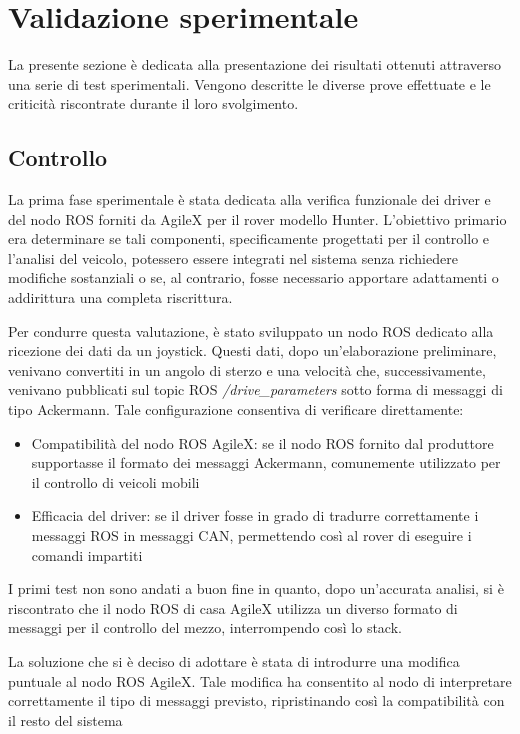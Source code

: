 \chapter{Validazione sperimentale}
La presente sezione è dedicata alla presentazione dei risultati ottenuti attraverso una serie di test sperimentali. Vengono descritte le diverse prove effettuate e le criticità riscontrate durante il loro svolgimento.

\section{Controllo}
La prima fase sperimentale è stata dedicata alla verifica funzionale dei driver e del nodo ROS forniti da AgileX per il rover modello Hunter. L'obiettivo primario era determinare se tali componenti, specificamente progettati per il controllo e l'analisi del veicolo, potessero essere integrati nel sistema senza richiedere modifiche sostanziali o se, al contrario, fosse necessario apportare adattamenti o addirittura una completa riscrittura.

\noindent Per condurre questa valutazione, è stato sviluppato un nodo ROS dedicato alla ricezione dei dati da un joystick. Questi dati, dopo un'elaborazione preliminare, venivano convertiti in un angolo di sterzo e una velocità che, successivamente, venivano pubblicati sul topic ROS \textit{/drive\_parameters} sotto forma di messaggi di tipo Ackermann. Tale configurazione consentiva di verificare direttamente:

\begin{itemize}
  \item Compatibilità del nodo ROS AgileX: se il nodo ROS fornito dal produttore supportasse il formato dei messaggi Ackermann, comunemente utilizzato per il controllo di veicoli mobili
  \item Efficacia del driver: se il driver fosse in grado di tradurre correttamente i messaggi ROS in messaggi CAN, permettendo così al rover di eseguire i comandi impartiti
\end{itemize}

\noindent I primi test non sono andati a buon fine in quanto, dopo un'accurata analisi, si è riscontrato che il nodo ROS di casa AgileX utilizza un diverso formato di messaggi per il controllo del mezzo, interrompendo così lo stack.

\noindent La soluzione che si è deciso di adottare è stata di introdurre una modifica puntuale al nodo ROS AgileX. Tale modifica ha consentito al nodo di interpretare correttamente il tipo di messaggi previsto, ripristinando così la compatibilità con il resto del sistema

